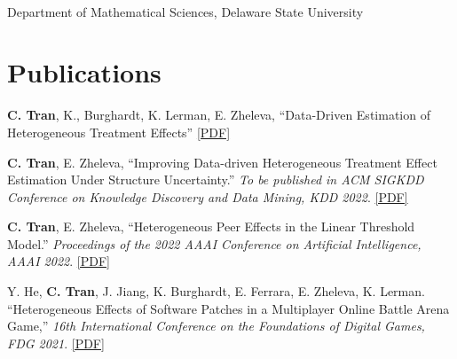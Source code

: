 \documentclass[mm]{simple_style}
\begin{document}
\begin{resume}
\\
Department of Mathematical Sciences, Delaware State University 

\vspace{-2ex}
\sectionline





\section{Publications}

\textbf{C. Tran}, K., Burghardt, K. Lerman, E. Zheleva, ``Data-Driven Estimation of Heterogeneous Treatment Effects'' \href{https://arxiv.org/pdf/2301.06615.pdf}{[PDF]}

\textbf{C. Tran}, E. Zheleva, ``Improving Data-driven Heterogeneous Treatment Effect Estimation Under Structure Uncertainty.'' \textit{To be published in ACM SIGKDD Conference on Knowledge Discovery and Data Mining, \textcolor{dorange}{KDD 2022}}. \href{https://dl.acm.org/doi/pdf/10.1145/3534678.3539444}{[PDF]}

\textbf{C. Tran}, E. Zheleva, ``Heterogeneous Peer Effects in the Linear Threshold Model.'' \textit{Proceedings of the 2022 AAAI Conference on Artificial Intelligence, \textcolor{dorange}{AAAI 2022}}. \href{https://www.aaai.org/AAAI22Papers/AAAI-11299.TranC.pdf}{[PDF]}

Y. He, \textbf{C. Tran}, J. Jiang, K. Burghardt, E. Ferrara, E. Zheleva, K. Lerman. ``Heterogeneous Effects of Software Patches in a Multiplayer Online Battle Arena Game,'' \textit{16th International Conference on the Foundations of Digital Games, \textcolor{dorange}{FDG 2021}}. \href{https://dl.acm.org/doi/pdf/10.1145/3472538.3472550}{[PDF]}


\end{resume}
\end{document}
